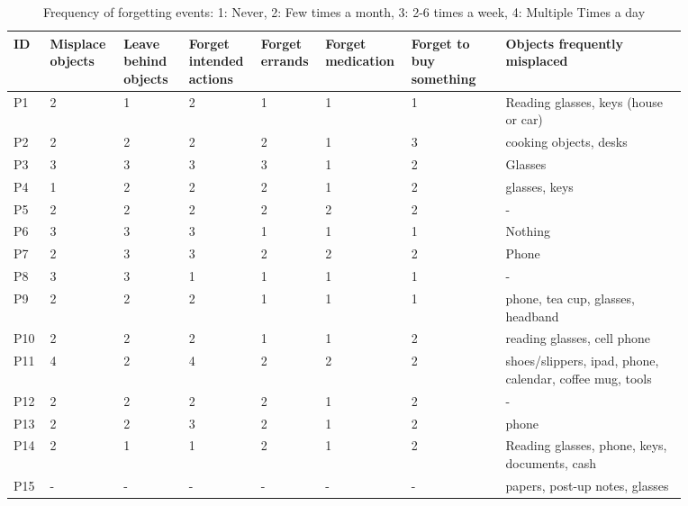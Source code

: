 
\label{fig:demographics}
\begin{table*}
    \centering
    \begin{tabular}{p{0.05\linewidth}p{0.1\linewidth}p{0.09\linewidth}p{0.09\linewidth}p{0.08\linewidth}p{0.08\linewidth}p{0.13\linewidth}p{0.25\linewidth}}
        \toprule
        \textbf{ID} & \textbf{Misplace objects} & \textbf{Leave behind objects} & \textbf{Forget intended actions} & \textbf{Forget errands} & \textbf{Forget medication} & \textbf{Forget to buy something} & \textbf{Objects frequently misplaced} \\
        \midrule
        P1 & 2 & 1 & 2 & 1 & 1 & 1 & Reading glasses, keys (house or car)\\
        P2 & 2 & 2 & 2 & 2 & 1 & 3 & cooking objects, desks \\
        P3 & 3 & 3 & 3 & 3 & 1 & 2 & Glasses\\
        P4 & 1 & 2 & 2 & 2 & 1 & 2 & glasses, keys\\
        P5 & 2 & 2 & 2 & 2 & 2 & 2 & -\\
        P6 & 3 & 3 & 3 & 1 & 1 & 1 & Nothing\\
        P7 & 2 & 3 & 3 & 2 & 2 & 2 & Phone\\
        P8 & 3 & 3 & 1 & 1 & 1 & 1 & -\\
        P9 & 2 & 2 & 2 & 1 & 1 & 1 & phone, tea cup, glasses, headband\\
        P10 & 2 & 2 & 2 & 1 & 1 & 2 & reading glasses, cell phone\\
        P11 & 4 & 2 & 4 & 2 & 2 & 2 & shoes/slippers, ipad, phone, calendar, coffee mug, tools\\
        P12 & 2 & 2 & 2 & 2 & 1 & 2 & -\\
        P13 & 2 & 2 & 3 & 2 & 1 & 2 & phone\\
        P14 & 2 & 1 & 1 & 2 & 1 & 2 & Reading glasses, phone, keys, documents, cash\\
        P15 & - & - & - & - & - & - & papers, post-up notes, glasses\\

        \midrule
        \bottomrule
    \end{tabular}
    \caption{Frequency of forgetting events: 1: Never, 2: Few times a month, 3: 2-6 times a week, 4: Multiple Times a day}
    \label{tab:demographics}
\end{table*}